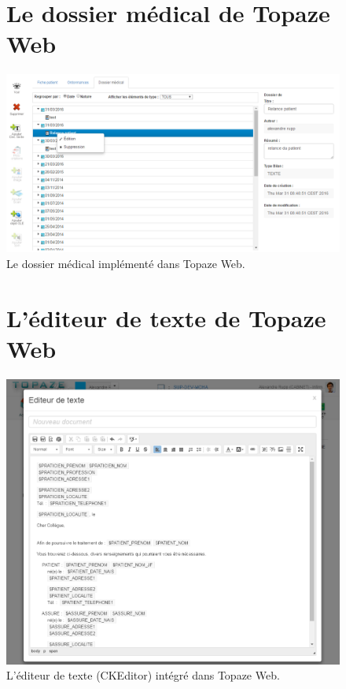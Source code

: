 \begin{appendices}
\begin{figure}[H]
\section*{Le dossier médical de Topaze Web}
  \centering
  \centerline{\includegraphics[width=18cm]{./img/dossier_medical_web2}}
  \caption{\label{fig:dossier_web} Le dossier médical implémenté dans Topaze Web.}
\end{figure}

\newpage
\begin{figure}[H]
\section*{L'éditeur de texte de Topaze Web}
  \centering
  \centerline{\includegraphics[width=18cm]{./img/editor2}} %
  \caption{\label{fig:editeur_web} L'éditeur de texte (CKEditor) intégré dans Topaze Web.}
\end{figure}
\newpage
\begin{figure}[H]

\end{figure}
\end{appendices}
